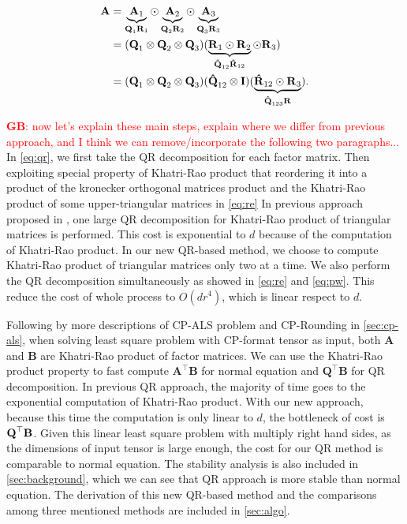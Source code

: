 \documentclass{article}
\newcommand{\mat}[1]{\mathbf{#1}}
\newcommand{\M}[2][]{\bm{#1{\mathbf{\MakeUppercase{#2}}}}} 		%
\newcommand{\kr}{\odot}
\newcommand{\kron}{\otimes}
\newcommand{\GB}[1]{\textcolor{red}{\textbf{GB}: #1}}
\begin{document}
\begin{align}
  \label{eq:qr} \M{A} &= \underbrace{\M{A}_1}_{{\M{Q}_1\M{R}_1}} \kr \underbrace{\M{A}_2}_{{\M{Q}_2\M{R}_2}} \kr \underbrace{\M{A}_3}_{{\M{Q}_3\M{R}_3}} \\ 
 \label{eq:re}&= (\M{Q}_1 \kron \M{Q}_2 \kron \M{Q}_3) (\underbrace{\M{R}_1 \kr \M{R}_2}_{\M[\hat]{Q}_{12} \M[\hat]{R}_{12}} \kr \M{R}_3) \\
 \label{eq:pw}&= (\M{Q}_1 \kron \M{Q}_2 \kron \M{Q}_3) (\M[\hat]{Q}_{12} \kron \M{I}) (\underbrace{\M[\hat]{R}_{12} \kr \M{R}_3}_{\M[\hat]{Q}_{123} \M{R}}). 
\end{align}

\GB{now let's explain these main steps, explain where we differ from previous approach, and I think we can remove/incorporate the following two paragraphs...}
In \cref{eq:qr}, we first take the QR decomposition for each factor matrix. 
Then exploiting special property of Khatri-Rao product that reordering it into a product of the kronecker orthogonal matrices product and the Khatri-Rao product of some upper-triangular matrices in \cref{eq:re}
In previous approach proposed in \cite{minster2021cp}, one large QR decomposition for Khatri-Rao product of triangular matrices is performed.
This cost is exponential to $d$ because of the computation of Khatri-Rao product.
In our new QR-based method, we choose to compute Khatri-Rao product of triangular matrices only two at a time.
We also perform the QR decomposition simultaneously as showed in \cref{eq:re} and \cref{eq:pw}.
This reduce the cost of whole process to $O(dr^4)$, which is linear respect to $d$.

Following by more descriptions of CP-ALS problem and CP-Rounding in \cref{sec:cp-als}, when solving least square problem with CP-format tensor as input, both $\mat{A}$ and $\mat{B}$ are Khatri-Rao product of factor matrices.
We can use the Khatri-Rao product property to fast compute $\mat{A}^\top\mat{B}$ for normal equation and $\mat{Q}^\top\mat{B}$ for QR decomposition.
In previous QR approach, the majority of time goes to the exponential computation of Khatri-Rao product.
With our new approach, because this time the computation is only linear to $d$, the bottleneck of cost is $\M{Q}^\top\mat{B}$.
Given this linear least square problem with multiply right hand sides, as the dimensions of input tensor is large enough, the cost for our QR method is comparable to normal equation.
The stability analysis is also included in \cref{sec:background}, which we can see that QR approach is more stable than normal equation.
The derivation of this new QR-based method and the comparisons among three mentioned methods are included in \cref{sec:algo}.
\end{document}
